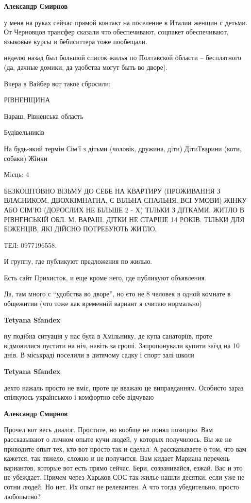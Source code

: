 \begin{itemize}
\begin{itemize}
\textbf{Александр Смирнов} 

у меня на руках сейчас прямой контакт на поселение в Италии женщин с детьми. От
Черновцов трансфер сказали что обеспечивают, соцпакет обеспечивают, языковые
курсы и бебиситтера тоже пообещали.

неделю назад был большой список жилья по Полтавской области -- бесплатного (да,
дачные домики, да удобства могут быть во дворе).

Вчера в Вайбер вот такое сбросили:

РІВНЕНЩИНА

Вараш, Рівненська область

Будівельників

На будь-який термін Сім'ї з дітьми (чоловік, дружина, діти) ДітиТварини (коти,
собаки) Жінки

Місць: 4

БЕЗКОШТОВНО ВІЗЬМУ ДО СЕБЕ НА КВАРТИРУ (ПРОЖИВАННЯ З ВЛАСНИКОМ, ДВОХКІМНАТНА, Є
ВІЛЬНА СПАЛЬНЯ. ВСІ УМОВИ) ЖІНКУ АБО СІМ'Ю (ДОРОСЛИХ НЕ БІЛЬШЕ 2 - Х) ТІЛЬКИ З
ДІТКАМИ. ЖИТЛО В РІВНЕНСЬКІЙ ОБЛ. М. ВАРАШ. ДІТКИ НЕ СТАРШЕ 14 РОКІВ. ТІЛЬКИ
ДЛЯ БІЖЕНЦІВ, ЯКІ ДІЙСНО ПОТРЕБУЮТЬ ЖИТЛО.

ТЕЛ: 0977196558.

И группу, где публикуют предложения по жилью.

Есть сайт Прихисток, и еще кроме него, где публикуют объявления.

Да, там много с \enquote{удобства во дворе}, но єто не 8 человек в одной
комнате в общежитии (что тоже как временній вариант я считаю нормально)

\textbf{Tetyana Sfandex} 

ну подібна ситуація у нас була в Хмільнику, де купа санаторіїв, проте
відмовилися пустити на ніч, навіть за гроші. Запропонували купити заїзд на 10
днів. В міськраді поселили в дитячому садку і спорт залі школи

\textbf{Tetyana Sfandex} 

дехто нажаль просто не вміє, проте це вважаю це виправданням. Особисто зараз
спілкуюсь українською і комфортно себе відчуваю

\textbf{Александр Смирнов} 

Прочел вот весь диалог. Простите, но вообще не понял позицию. Вам рассказывают
о личном опыте кучи людей, у которых получилось. Вы же не приводите опыт тех,
кто вот просто так и сделал. А рассказываете о том, что вам кажется, так
тяжело, сложно и не получится. Вам кидает Мариана перечень вариантов, которые
вот есть прямо сейчас. Бери, созванивайся, езжай. Вас и это не убеждает. Причем
через Харьков-СОС так жилье нашли десятки, если уже не сотни людей. Но нет. Их
опыт не релевантен. А что тогда убедительно, просто любопытно?


\end{itemize}
\end{itemize}
